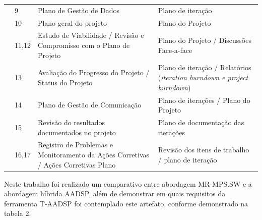 \documentclass{acm_proc_article-sp}
\begin{document}
\begin{table}[h]
\begin{tabular}{|p{20mm}|p{10mm}|p{60mm}|p{60mm}|}
& 9 & Plano de Gestão de Dados & Plano de iteração \\
& 10 & Plano geral do projeto & Plano do Projeto \\
& 11,12 & Estudo de Viabilidade / Revisão e Compromisso com o Plano de Projeto & Plano do Projeto / Discussões Face-a-face \\
& 13 & Avaliação do Progresso do Projeto / Status do Projeto & Plano de iteração / Relatórios (\textit{iteration burndown
e project burndown})\\
& 14 & Plano de Gestão de Comunicação & Plano de iterações / Plano do Projeto \\
& 15 & Revisão do resultados documentados no projeto & Plano de documentação das iterações \\
& 16,17 & Registro de Problemas e Monitoramento da Ações Corretivas / Ações Corretivas Plano & Revisão dos itens de trabalho / plano de iteração \\

\hline
\end{tabular}
\end{table}

Neste trabalho foi realizado um comparativo entre abordagem MR-MPS.SW e a abordagem híbrida AADSP, além de demonstrar em quais requisitos da ferramenta T-AADSP foi contemplado este artefato, conforme demonstrado na tabela 2.
\end{document}
